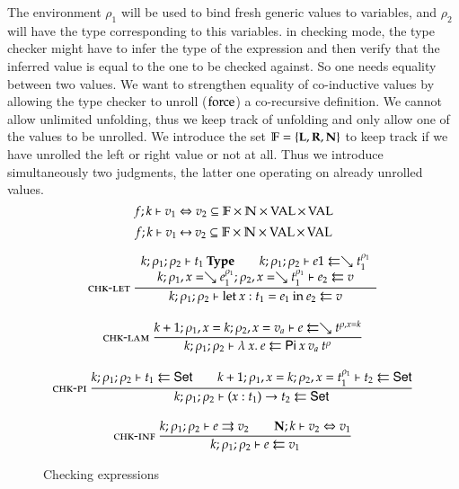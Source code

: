 The environment $\rho_1$ will be used to bind fresh generic values to variables, and $\rho_2$ will have the type corresponding to this variables. in checking mode, the type checker might have to infer the type of the expression and then verify that the inferred value is equal to the one to be checked against.
So one needs equality between two values.
We want to strengthen equality of co-inductive values by allowing the type checker to unroll ($\operatorname{force}$) a co-recursive definition. We cannot allow unlimited unfolding, thus we keep track of unfolding and only allow one of the values to be unrolled.
We introduce the set $ \mathbb{F} = \{\mathbf{L}, \mathbf{R}, \mathbf{N} \} $ to keep track if we have unrolled the left or right value or not at all.
Thus we introduce simultaneously two judgments, the latter one operating on already unrolled values.
\[f;k\vdash v_1\Leftrightarrow v_2 \subseteq \mathbb{F} \times \mathbb{N} \times \operatorname{VAL} \times \operatorname{VAL} \]
\[f;k\vdash v_1{\:\leftrightarrow\:}v_2 \subseteq \mathbb{F} \times \mathbb{N} \times\operatorname{VAL} \times \operatorname{VAL} \]

\begin{figure}

\begin{gather*}
\mbox{\sc chk-let}\ \dfrac{\begin{array}[b]{c}
k;\rho_1;\rho_2\vdash t_1\:\mathbf{Type}
\qquad
k;\rho_1;\rho_2\vdash e1\leftleftarrows\searrow t_1^{\rho_1}
\\
k;\rho_1,x=\searrow e_1^{\rho_1};\rho_2,x=\searrow t_1^{\rho_1}\vdash e_2\leftleftarrows v
\end{array}}{k;\rho_1;\rho_2\vdash\mathrm{let}\: x : t_1 = e_1 \: \mathrm{in}\:{e_2}\leftleftarrows v}
\\[2ex]
\mbox{\sc chk-lam}\ \dfrac{k+1;\rho_1,x=k;\rho_2,x=v_a\vdash e\leftleftarrows\searrow t^{\rho,x=k}}{k;\rho_1;\rho_2\vdash\lambda\: x .\:{e}\leftleftarrows\mathsf{Pi} \: x \: v_a \: t^{\rho}}
\\[2ex]
\mbox{\sc chk-pi}\ \dfrac{k;\rho_1;\rho_2\vdash t_1\leftleftarrows\mathsf{Set}
\qquad
k+1;\rho_1,x=k;\rho_2,x=t_1^{\rho_1}\vdash t_2\leftleftarrows\mathsf{Set}
}{k;\rho_1;\rho_2\vdash( x : t_1 ) \rightarrow{t_2}\leftleftarrows\mathsf{Set}}
\\[2ex]
\mbox{\sc chk-inf}\ \dfrac{k;\rho_1;\rho_2\vdash e\rightrightarrows v_2
\qquad
{\mathbf{N};k\vdash v_2\Leftrightarrow v_1}}{k;\rho_1;\rho_2\vdash e\leftleftarrows v_1}
\end{gather*}
\caption{Checking expressions}
\end{figure}

